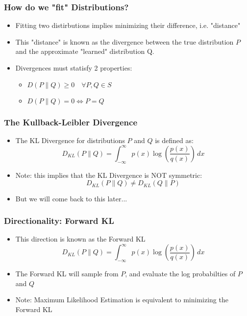 \documentclass{beamer}
\begin{document}
\begin{frame}
  \frametitle{How do we "fit" Distributions?}
  \begin{itemize}
    \item Fitting two distirbutions implies minimizing their difference,
      i.e. "distance"
    \item This "distance" is known as the divergence between the true distribution
    $P$ and the approximate "learned" distribution Q.
    \pause
    \item Divergences must statisfy 2 properties:
    \begin{itemize}
      \item $D(P \parallel Q ) \geq 0 \quad \forall P, Q \in S$
      \item $D(P \parallel Q ) = 0 \iff P = Q$
    \end{itemize}
  \end{itemize}

\end{frame}

\begin{frame}
  \frametitle{The Kullback-Leibler Divergence}
  \begin{itemize}
    \item The KL Divergence for distributions $P$ and $Q$ is defined as:
    \begin{equation*}
      D_{KL} (P \parallel Q) = \int_{-\infty}^{\infty} p(x)\log \left({\frac {p(x)}{q(x)}}\right)\,dx
    \end{equation*}
    \pause
    \item Note: this implies that the KL Divergence is NOT symmetric:
    \begin{equation*}
      D_{KL} (P \parallel Q) \not= D_{KL} (Q \parallel P)
    \end{equation*}
    \item But we will come back to this later...
  \end{itemize}
\end{frame}


\begin{frame}
  \frametitle{Directionality: Forward KL}
  \begin{itemize}
    \item This direction is known as the Forward KL
    \begin{equation*}
      D_{KL} (P \parallel Q) = \int_{-\infty}^{\infty} p(x)\log \left({\frac {p(x)}{q(x)}}\right)\,dx
    \end{equation*}
    \pause
    \item The Forward KL will sample from $P$, and evaluate the log probabilties of $P$ and $Q$
    \pause
    \item Note: Maximum Likelihood Estimation is equivalent to minimizing the Forward KL
  \end{itemize}
\end{frame}
\end{document}
